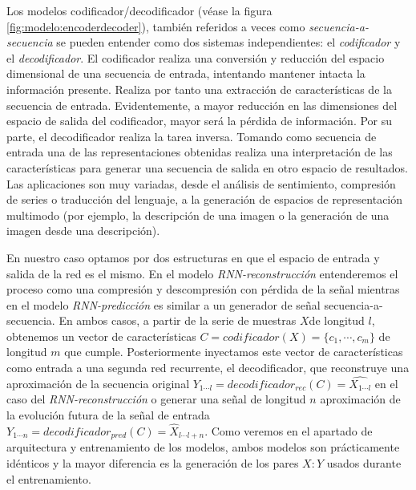 Los modelos codificador/decodificador (véase la figura \ref{fig:modelo:encoderdecoder}), también referidos a veces como \textit{secuencia-a-secuencia} se pueden entender como dos sistemas independientes: el \textit{codificador} y el \textit{decodificador}. El codificador realiza una conversión y reducción del espacio dimensional de una secuencia de entrada, intentando mantener intacta la información presente. Realiza por tanto una extracción de características de la secuencia de entrada. Evidentemente, a mayor reducción en las dimensiones del espacio de salida del codificador, mayor será la pérdida de información. Por su parte, el decodificador realiza la tarea inversa. Tomando como secuencia de entrada una de las representaciones obtenidas realiza una interpretación de las características para generar una secuencia de salida en otro espacio de resultados. Las aplicaciones son muy variadas, desde el análisis de sentimiento, compresión de series o traducción del lenguaje, a la generación de espacios de representación multimodo (por ejemplo, la descripción de una imagen o la generación de una imagen desde una descripción). 

En nuestro caso optamos por dos estructuras en que el espacio de entrada y salida de la red es el mismo. En el modelo \textit{RNN-reconstrucción} entenderemos el proceso como una compresión y descompresión con pérdida de la señal mientras en el modelo \textit{RNN-predicción} es similar a un generador de señal secuencia-a-secuencia. En ambos casos, a partir de la serie de muestras $X$de longitud $l$, obtenemos un vector de características $C=codificador(X)=\{c_1,\cdots,c_m\}$ de longitud $m$ que cumple. Posteriormente inyectamos este vector de características como entrada a una segunda red recurrente, el decodificador, que reconstruye una aproximación de la secuencia original $Y_{1\cdots l}=decodificador_{rec}(C)=\hat{X_{1\cdots l}}$ en el caso del \textit{RNN-reconstrucción} o generar una señal de longitud $n$ aproximación de la evolución futura de la señal de entrada $Y_{1\cdots n}=decodificador_{pred}(C)=\hat{X}_{l\cdots l+n}$. Como veremos en el apartado de arquitectura y entrenamiento de los modelos, ambos modelos son prácticamente idénticos y la mayor diferencia es la generación de los pares $X:Y$ usados durante el entrenamiento.

